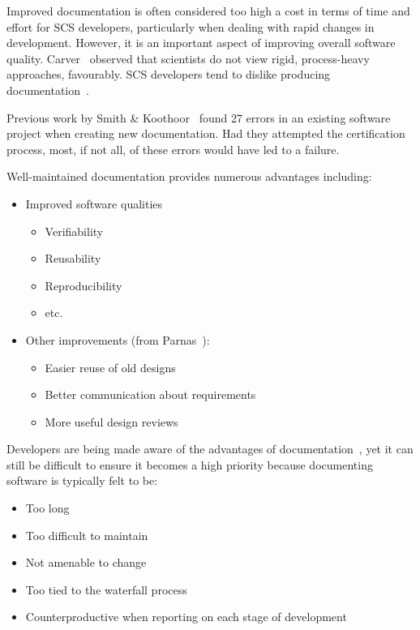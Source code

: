 \documentclass[sigconf]{acmart}
\begin{document}
Improved documentation is often considered too high a cost in terms of time and 
effort for SCS developers, particularly when dealing with rapid changes in 
development. However, it is an important aspect of improving overall software 
quality. Carver~\cite{CarverEtAl2007} observed that scientists do not view 
rigid, process-heavy approaches, favourably. SCS developers tend to dislike 
producing documentation~\cite[p.~373]{Roache1998}.

Previous work by Smith \& Koothoor~\citep{SmithAndKoothoor2016} found 27 errors 
in an existing software project when creating new documentation. Had they 
attempted the certification process, most, if not all, of these errors would 
have led to a failure.

Well-maintained documentation provides numerous advantages including:
\begin{itemize}
\item Improved software qualities 
	\begin{itemize}
	\item Verifiability
	\item Reusability
	\item Reproducibility
	\item etc.
	\end{itemize}

\item Other improvements (from Parnas~\cite{Parnas2010}):
	\begin{itemize}
		\item Easier reuse of old designs
		\item Better communication about requirements
		\item More useful design reviews
	\end{itemize}
\end{itemize}

Developers are being made aware of the advantages of 
documentation~\cite{SmithJegatheesanAndKelly2016}, yet it can still be difficult 
to ensure it becomes a high priority because documenting software is typically 
felt to be:

\begin{itemize}
\item Too long
\item Too difficult to maintain
\item Not amenable to change
\item Too tied to the waterfall process
\item Counterproductive when reporting on each stage of 
		development~\citep{Roache1998}
\end{itemize}
\end{document}
